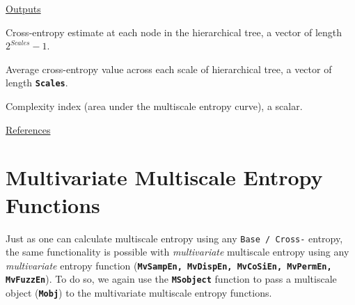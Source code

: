 \documentclass[12pt, a4paper, titlepage, openany]{book}
\begin{document}
\noindent \ul{Outputs}
\begin{description}[labelsep=1cm, labelwidth=2cm, nosep, style=multiline,leftmargin=3cm]\footnotesize
\item[\texttt{MSx}]		Cross-entropy estimate at each node in the hierarchical tree, a vector of length $2^{Scales}-1$.
\item[\texttt{Sn}]		Average cross-entropy value across each scale of hierarchical tree, a vector of length \texttt{\textbf{Scales}}.
\item[\texttt{Ci}]		Complexity index (area under the multiscale entropy curve), a scalar.
\end{description}

\noindent \ul{References}\hspace{1cm}
\cite{hMS1} 





\newpage
\section{Multivariate Multiscale Entropy Functions}
\vspace{7em}

Just as one can calculate multiscale entropy using any \texttt{Base / Cross-} entropy, the same functionality is possible with \textit{multivariate} multiscale entropy using any \textit{multivariate} entropy function (\texttt{\textbf{MvSampEn, MvDispEn, MvCoSiEn, MvPermEn, MvFuzzEn}}). To do so, we again use the \texttt{\textbf{MSobject}} function to pass a multiscale object (\texttt{\textbf{Mobj}}) to the multivariate multiscale entropy functions.

\begin{center}
  \ \\
\end{center}
 
\end{document}
